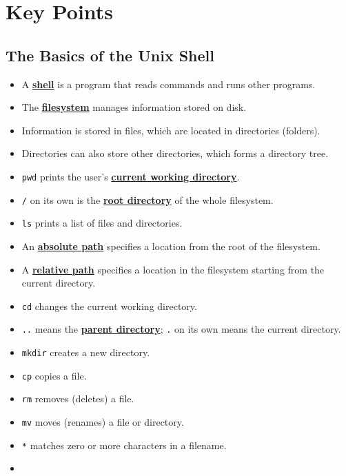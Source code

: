 \documentclass[
]{krantz}
\providecommand{\tightlist}{%
  \setlength{\itemsep}{0pt}\setlength{\parskip}{0pt}}
\newcommand{\gref}[2]{\hyperlink{#2}{\textbf{#1}}}
\begin{document}
\hypertarget{keypoints}{%
\chapter{Key Points}\label{keypoints}}

\hypertarget{the-basics-of-the-unix-shell-1}{%
\section{The Basics of the Unix Shell}\label{the-basics-of-the-unix-shell-1}}

\begin{itemize}
\tightlist
\item
  A \gref{shell}{shell} is a program that reads commands and runs other programs.
\item
  The \gref{filesystem}{filesystem} manages information stored on disk.
\item
  Information is stored in files, which are located in directories (folders).
\item
  Directories can also store other directories, which forms a directory tree.
\item
  \texttt{pwd} prints the user's \gref{current working directory}{current\_working\_directory}.
\item
  \texttt{/} on its own is the \gref{root directory}{root\_directory} of the whole filesystem.
\item
  \texttt{ls} prints a list of files and directories.
\item
  An \gref{absolute path}{absolute\_path} specifies a location from the root of the filesystem.
\item
  A \gref{relative path}{relative\_path} specifies a location in the filesystem starting from the current directory.
\item
  \texttt{cd} changes the current working directory.
\item
  \texttt{..} means the \gref{parent directory}{parent\_directory}; \texttt{.} on its own means the current directory.
\item
  \texttt{mkdir} creates a new directory.
\item
  \texttt{cp} copies a file.
\item
  \texttt{rm} removes (deletes) a file.
\item
  \texttt{mv} moves (renames) a file or directory.
\item
  \texttt{*} matches zero or more characters in a filename.
\item

\end{itemize}
\end{document}
